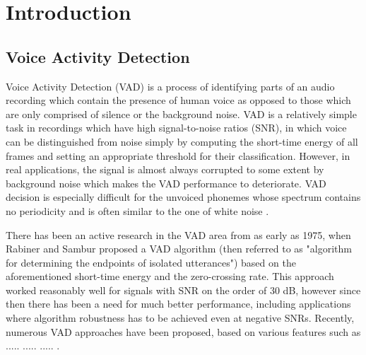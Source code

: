 
\chapter{Introduction} %

\label{Chapter1} %



\section{Voice Activity Detection}

Voice Activity Detection (VAD) is a process of identifying parts of an audio recording which contain the presence of human voice as opposed to those which are only comprised of silence or the background noise. VAD is a relatively simple task in recordings which have high signal-to-noise ratios (SNR), in which voice can be distinguished from noise simply by computing the short-time energy of all frames and setting an appropriate threshold for their classification. However, in real applications, the signal is almost always corrupted to some extent by background noise which makes the VAD performance to deteriorate. VAD decision is especially difficult for the unvoiced phonemes \cite{Kondoz} whose spectrum contains no periodicity and is often similar to the one of white noise \cite{Michaelis}.

There has been an active research in the VAD area from as early as 1975, when Rabiner and Sambur \cite{RabinerSambur} proposed a VAD algorithm (then referred to as "algorithm for determining the endpoints of isolated utterances") based on the aforementioned short-time energy and the zero-crossing rate. This approach worked reasonably well for signals with SNR on the order of 30 dB, however since then there has been a need for much better performance, including applications where algorithm robustness has to be achieved even at negative SNRs. Recently, numerous VAD approaches have been proposed, based on various features such as ..... ..... ..... . 

